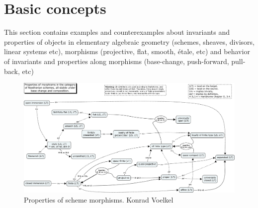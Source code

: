 \documentclass[../main.tex]{subfiles}
\begin{document}
\section{Basic concepts}
This section contains examples and counterexamples about invariants and properties of objects in elementary algebraic geometry (schemes, sheaves, divisors, linear systems etc), morphisms (projective, flat, smooth, \'{e}tale, etc) and behavior of invariants and properties along morphisms (base-change, push-forward, pull-back, etc)
\begin{figure}[h!]
\centering
\includegraphics[width=\textwidth]{img/morphisms.png}
\caption{Properties of scheme morphisms. Konrad Voelkel}
\label{fig:Properties of sheme morphims; Konrad Voelkel}
\end{figure}
\end{document}
